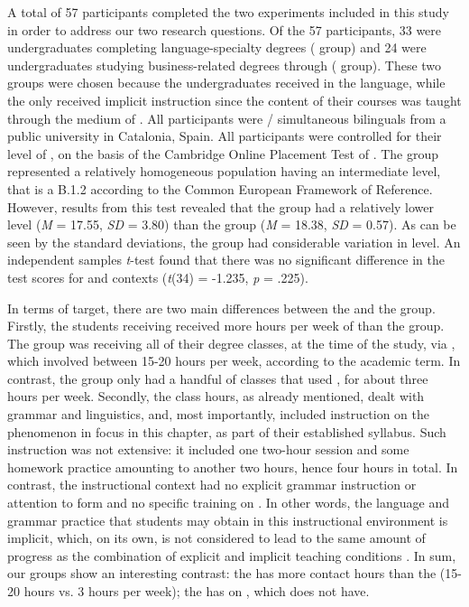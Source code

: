 \documentclass[output=paper]{langsci/langscibook}
\begin{document}
A total of 57 participants completed the two experiments included in this study in order to address our two research questions. Of the 57 participants, 33 were undergraduates completing language-specialty degrees ( group) and 24 were undergraduates studying business-related degrees through  ( group). These two groups were chosen because the  undergraduates received  in the  language, while the  only received implicit instruction since the content of their courses was taught through the medium of . All participants were / simultaneous bilinguals from a public university in Catalonia, Spain. All participants were controlled for their level of , on the basis of the Cambridge Online Placement Test of . The group represented a relatively homogeneous population having an intermediate level, that is a B.1.2 according to the Common European Framework of Reference. However, results from this test revealed that the  group had a relatively lower level (\textit{M} = 17.55, \textit{SD} = 3.80) than the  group (\textit{M} = 18.38, \textit{SD} = 0.57). As can be seen by the standard deviations, the  group had considerable variation in level. An independent samples \textit{t}{}-test found that there was no significant difference in the  test scores for  and  contexts (\textit{t}(34) = -1.235, \textit{p} = .225).

In terms of target, there are two main differences between the  and the  group. Firstly, the students receiving  received more hours per week of   than the  group. The  group was receiving all of their degree classes, at the time of the study, via , which involved between 15-20 hours per week, according to the academic term. In contrast, the  group only had a handful of classes that used , for about  three hours per week. Secondly, the  class hours, as already mentioned, dealt with grammar and linguistics, and, most importantly, included instruction on the phenomenon in focus in this chapter, as part of their established syllabus. Such instruction was not extensive: it included one two-hour session and some homework practice amounting to another two hours, hence four hours in total. In contrast, the  instructional context had no explicit grammar instruction or attention to form and no specific training on . In other words, the language and grammar practice that students may obtain in this instructional environment is implicit, which, on its own, is not considered to lead to the same amount of progress as the combination of explicit and implicit teaching conditions \citep{Ellis2010}. In sum, our groups show an interesting contrast: the  has more contact hours than the  (15-20 hours vs. 3 hours per week); the  has  on , which  does not have. 
\end{document}
